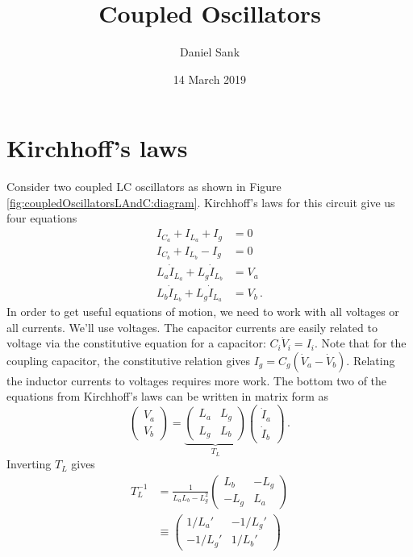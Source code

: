 \documentclass{article}
\author{Daniel Sank}
\date{14 March 2019}
\title{Coupled Oscillators}
\begin{document}
\maketitle
\tableofcontents

\section{Kirchhoff's laws}


Consider two coupled LC oscillators as shown in Figure \ref{fig:coupledOscillatorsLAndC:diagram}.
Kirchhoff's laws for this circuit give us four equations
\begin{align}
  I_{C_a} + I_{L_a} + I_g &= 0 \nonumber \\
  I_{C_b} + I_{L_b} - I_g &= 0 \nonumber \\
  L_a \dot I_{L_a} + L_g \dot I_{L_b} &= V_a \nonumber \\
  L_b \dot I_{L_b} + L_g \dot I_{L_a} &= V_b
  \, .
\end{align}
In order to get useful equations of motion, we need to work with all voltages or all currents.
We'll use voltages.
The capacitor currents are easily related to voltage via the constitutive equation for a capacitor: $C_i \dot V_i = I_i$.
Note that for the coupling capacitor, the constitutive relation gives $I_g = C_g (\dot V_a - \dot V_b)$.
Relating the inductor currents to voltages requires more work.
The bottom two of the equations from Kirchhoff's laws can be written in matrix form as
\begin{equation*}
  \left( \begin{array}{c}
    V_a \\ V_b
  \end{array}\right)
  = \underbrace{ \left( \begin{array}{cc}
    L_a & L_g \\
    L_g & L_b
  \end{array} \right)}_{T_L}
  \left( \begin{array}{c}
    \dot I_a \\ \dot I_b
  \end{array}\right)
  \, .
\end{equation*}
Inverting $T_L$ gives
\begin{align*}
  T_L^{-1}
  &= \frac{1}{L_a L_b - L_g^2} \left( \begin{array}{cc}
    L_b & -L_g \\ -L_g & L_a
  \end{array} \right) \\
  & \equiv \left( \begin{array}{cc}
    1 / L_a' & -1 / L_g' \\ -1 / L_g' & 1 / L_b'
  \end{array} \right)
\end{align*}
\end{document}
